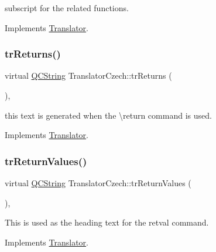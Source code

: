 subscript for the related functions. 

Implements \mbox{\hyperlink{class_translator}{Translator}}.

\mbox{\label{class_translator_czech_a7b1a5d5c58359d6c1315a8bac3fe44a3}} 
\subsubsection{\texorpdfstring{trReturns()}{trReturns()}}
{\footnotesize\ttfamily virtual \mbox{\hyperlink{class_q_c_string}{Q\+C\+String}} Translator\+Czech\+::tr\+Returns (\begin{DoxyParamCaption}{ }\end{DoxyParamCaption})\hspace{0.3cm}{\ttfamily [inline]}, {\ttfamily [virtual]}}

this text is generated when the \textbackslash{}return command is used. 

Implements \mbox{\hyperlink{class_translator}{Translator}}.

\mbox{\label{class_translator_czech_a3a23afb35840149ceb0fcb35ee497cc3}} 
\subsubsection{\texorpdfstring{trReturnValues()}{trReturnValues()}}
{\footnotesize\ttfamily virtual \mbox{\hyperlink{class_q_c_string}{Q\+C\+String}} Translator\+Czech\+::tr\+Return\+Values (\begin{DoxyParamCaption}{ }\end{DoxyParamCaption})\hspace{0.3cm}{\ttfamily [inline]}, {\ttfamily [virtual]}}

This is used as the heading text for the retval command. 

Implements \mbox{\hyperlink{class_translator}{Translator}}.

\mbox{\label{class_translator_czech_a8c606b50d1afc33b7a86c36292a7b54b}} 

